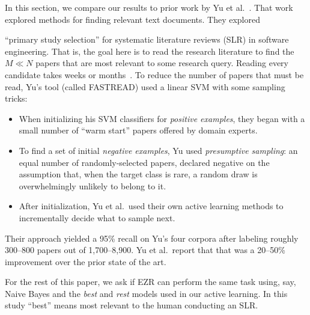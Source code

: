 \documentclass[AMA,STIX2COL]{WileyNJDv5}
\begin{document}
In this section, we compare our results to prior work 
by
Yu et al.~\cite{yu2018total}.
That work
explored methods for 
finding relevant text documents.
They explored  
{``primary study selection'' for
systematic literature reviews (SLR)
in software engineering. 
That is, the goal here is 
to read
the research literature
to find the $M\ll N$
papers that are most relevant
to some research query.
 Reading
every candidate takes weeks or months~\cite{yu2017feature,Yu2018}.
To reduce the number of papers that must be read, Yu's tool 
(called FASTREAD) used a linear SVM with
some sampling tricks:
\begin{itemize}
\item 
When initializing his SVM classifiers for {\em positive examples},
they began with a small number of ``warm start'' papers offered by domain experts. 

\item To
find a set of initial {\em negative examples}, Yu used {\em presumptive sampling}:
  an equal number of randomly-selected papers, declared negative on
  the assumption that, when the target class is rare, a random draw
  is overwhelmingly unlikely to belong to it.
  \item After initialization, Yu et al.\ used their own active learning
  methods to incrementally decide what to sample next.
\end{itemize}
Their approach yielded a 95\% recall on Yu's four corpora after labeling
roughly 300--800 papers out of 1,700--8,900. 
Yu et al.\ report that that was a
20--50\% improvement over the prior state of the
art.

For the rest of this paper,  we  ask if EZR can perform the same task using, say,
Naive Bayes and the {\em best} and {\em rest} models
used in our active learning.  
In this study ``best'' means most relevant to the human conducting an SLR.

}
\end{document}
